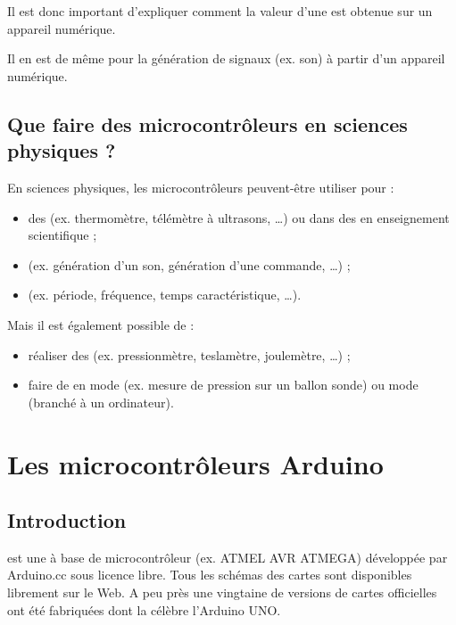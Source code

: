 \documentclass[a4paper,10pt,french]{book}
\begin{document}
Il est donc important d’expliquer comment la valeur d’une  est obtenue sur un appareil numérique.

Il en est de même pour la génération de signaux (ex. son) à partir d’un appareil numérique.


\section{Que faire des microcontrôleurs en sciences physiques ?}
\label{\detokenize{1_introduction/introduction:que-faire-des-microcontroleurs-en-sciences-physiques}}
En sciences physiques, les microcontrôleurs peuvent-être utiliser pour :
\begin{itemize}
\item {} 
des  (ex. thermomètre, télémètre à ultrasons, …) ou dans des  en enseignement scientifique ;

\item {} 
 (ex. génération d’un son, génération d’une commande, …) ;

\item {} 
 (ex. période, fréquence, temps caractéristique, …).

\end{itemize}

Mais il est également possible de :
\begin{itemize}
\item {} 
réaliser des  (ex. pressionmètre, teslamètre, joulemètre, …) ;

\item {} 
faire de  en mode  (ex. mesure de pression sur un ballon sonde) ou mode  (branché à un ordinateur).

\end{itemize}


\chapter{Les microcontrôleurs Arduino}
\label{\detokenize{2_arduino/index:les-microcontroleurs-arduino}}\label{\detokenize{2_arduino/index::doc}}

\section{Introduction}
\label{\detokenize{2_arduino/1_introduction:introduction}}\label{\detokenize{2_arduino/1_introduction::doc}}
 est une  à base de microcontrôleur (ex. ATMEL AVR ATMEGA) développée par Arduino.cc sous licence libre. Tous les schémas des cartes sont disponibles librement sur le Web. A peu près une vingtaine de versions de cartes officielles ont été fabriquées dont la célèbre l’Arduino UNO.
\end{document}
